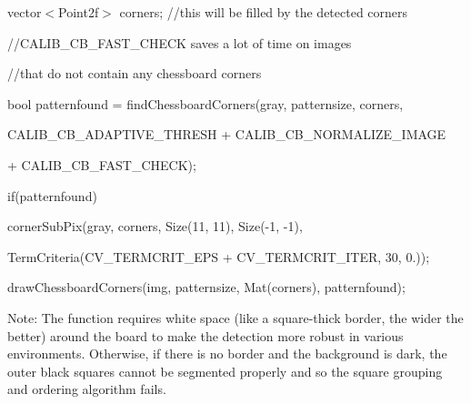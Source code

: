 {\ttfamily }

{\ttfamily }

{\ttfamily vector$<$\+Point2f$>$ corners; //this will be filled by the detected corners}

{\ttfamily }

{\ttfamily }

{\ttfamily //\+C\+A\+L\+I\+B\+\_\+\+C\+B\+\_\+\+F\+A\+S\+T\+\_\+\+C\+H\+E\+CK saves a lot of time on images}

{\ttfamily }

{\ttfamily }

{\ttfamily //that do not contain any chessboard corners}

{\ttfamily }

{\ttfamily }

{\ttfamily bool patternfound = find\+Chessboard\+Corners(gray, patternsize, corners,}

{\ttfamily }

{\ttfamily }

{\ttfamily C\+A\+L\+I\+B\+\_\+\+C\+B\+\_\+\+A\+D\+A\+P\+T\+I\+V\+E\+\_\+\+T\+H\+R\+E\+SH + C\+A\+L\+I\+B\+\_\+\+C\+B\+\_\+\+N\+O\+R\+M\+A\+L\+I\+Z\+E\+\_\+\+I\+M\+A\+GE}

{\ttfamily }

{\ttfamily }

{\ttfamily + C\+A\+L\+I\+B\+\_\+\+C\+B\+\_\+\+F\+A\+S\+T\+\_\+\+C\+H\+E\+CK);}

{\ttfamily }

{\ttfamily }

{\ttfamily if(patternfound)}

{\ttfamily }

{\ttfamily }

{\ttfamily corner\+Sub\+Pix(gray, corners, Size(11, 11), Size(-\/1, -\/1),}

{\ttfamily }

{\ttfamily }

{\ttfamily Term\+Criteria(C\+V\+\_\+\+T\+E\+R\+M\+C\+R\+I\+T\+\_\+\+E\+PS + C\+V\+\_\+\+T\+E\+R\+M\+C\+R\+I\+T\+\_\+\+I\+T\+ER, 30, 0.));}

{\ttfamily }

{\ttfamily }

{\ttfamily draw\+Chessboard\+Corners(img, patternsize, Mat(corners), patternfound);}

{\ttfamily }

{\ttfamily }

{\ttfamily Note\+: The function requires white space (like a square-\/thick border, the wider the better) around the board to make the detection more robust in various environments. Otherwise, if there is no border and the background is dark, the outer black squares cannot be segmented properly and so the square grouping and ordering algorithm fails. }


